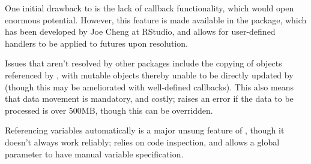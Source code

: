 One initial drawback to  is the lack of callback functionality, which would open enormous potential.
However, this feature is made available in the  package, which has been developed by Joe Cheng at RStudio, and allows for user-defined handlers to be applied to futures upon resolution\cite{cheng2021promises}.

Issues that aren't resolved by other packages include the copying of objects referenced by , with mutable objects thereby unable to be directly updated by  (though this may be ameliorated with well-defined callbacks).
This also means that data movement is mandatory, and costly;  raises an error if the data to be processed is over 500MB, though this can be overridden.

Referencing variables automatically is a major unsung feature of , though it doesn't always work reliably;  relies on code inspection, and allows a global parameter to have manual variable specification.
